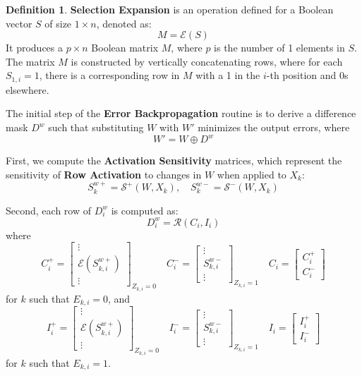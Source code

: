 \documentclass{article}
\theoremstyle{definition}
\newtheorem*{definition}{Definition}
\theoremstyle{remark}
\begin{document}
\begin{definition}
    \textbf{Selection Expansion} is an operation defined for a Boolean vector \( S \) of size \( 1 \times n \), denoted as:
    \[ M = \mathcal{E}(S) \]
    It produces a \( p \times n \) Boolean matrix \( M \), where \( p \) is the number of 1 elements in \( S \). The matrix \( M \) is constructed by vertically concatenating rows, where for each \( S_{1,i} = 1 \), there is a corresponding row in \( M \) with a 1 in the \( i \)-th position and 0s elsewhere.
\end{definition}

The initial step of the \textbf{Error Backpropagation} routine is to derive a difference mask \( D^w \) such that substituting \( W \) with \( W' \) minimizes the output errors, where
\[ W' = W \oplus D^w \]

First, we compute the \textbf{Activation Sensitivity} matrices, which represent the sensitivity of \textbf{Row Activation} to changes in \( W \) when applied to \( X_k \):
\[ S^{w+}_k = \mathcal{S^+}(W, X_k), \quad S^{w-}_k = \mathcal{S^-}(W, X_k) \]

Second, each row of \( D^w_i \) is computed as:
\[ D^w_i = \mathcal{R}(C_i, I_i) \]
where
\[
    C^+_i = \begin{bmatrix} \vdots \\ \mathcal{E}(S^{w+}_{k,i}) \\ \vdots \end{bmatrix}_{Z_{k,i} = 0} \quad
    C^-_i = \begin{bmatrix} \vdots \\ S^{w-}_{k,i} \\ \vdots \end{bmatrix}_{Z_{k,i} = 1} \quad
    C_i = \begin{bmatrix} C^+_i \\ C^-_i \end{bmatrix}
\]
for \( k \) such that \( E_{k,i} = 0 \), and
\[
    I^+_i = \begin{bmatrix} \vdots \\ \mathcal{E}(S^{w+}_{k,i}) \\ \vdots \end{bmatrix}_{Z_{k,i} = 0} \quad
    I^-_i = \begin{bmatrix} \vdots \\ S^{w-}_{k,i} \\ \vdots \end{bmatrix}_{Z_{k,i} = 1} \quad
    I_i = \begin{bmatrix} I^+_i \\ I^-_i \end{bmatrix}
\]
for \( k \) such that \( E_{k,i} = 1 \).
\end{document}
